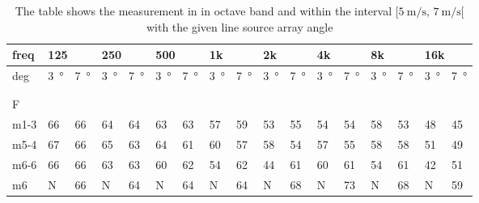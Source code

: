 \begin{table}[H]
\centering
\caption{The table shows the measurement in in octave band and within the interval $[\SI{5}{\meter\per\second},\, \SI{7}{\meter\per\second}[ $ with the given line source array angle}
\begin{tabular}{l|l|l|l|l|l|l|l|l|l|l|l|l|l|l|ll}
freq & \multicolumn{2}{l|}{125} & \multicolumn{2}{l|}{250} & \multicolumn{2}{l|}{500} & \multicolumn{2}{l|}{1k} & \multicolumn{2}{l|}{2k} & \multicolumn{2}{l|}{4k} & \multicolumn{2}{l|}{8k} & \multicolumn{2}{l}{16k}  \\ \hline
deg  &     \SI{3}{\degree}        &    \SI{7}{\degree}          &     \SI{3}{\degree}          &   \SI{7}{\degree}           &       \SI{3}{\degree}        &      \SI{7}{\degree}        &     \SI{3}{\degree}         &     \SI{7}{\degree}         &       \SI{3}{\degree}       &    \SI{7}{\degree}          &      \SI{3}{\degree}        &        \SI{7}{\degree}      &      \SI{3}{\degree}        &       \SI{7}{\degree}       & \multicolumn{1}{l|}{ \SI{3}{\degree} } &  \SI{7}{\degree}  \\ \hline
 & \multicolumn{2}{l|}{} & \multicolumn{2}{l|}{} & \multicolumn{2}{l|}{} & \multicolumn{2}{l|}{} & \multicolumn{2}{l|}{} & \multicolumn{2}{l|}{}& \multicolumn{2}{l|}{}& \multicolumn{2}{l}{}     \\ 
\multicolumn{17}{l}{ } \\   
F & \multicolumn{2}{l|}{} & \multicolumn{2}{l|}{} & \multicolumn{2}{l|}{} & \multicolumn{2}{l|}{} & \multicolumn{2}{l|}{} & \multicolumn{2}{l|}{}& \multicolumn{2}{l|}{}& \multicolumn{2}{l}{}     \\ \hline
m1-3  &     66   &      66  &   64    &  64      &        63     &    63       &  57       &    59        &    53         &    55        &      54       &     54       &      58      &    53        & \multicolumn{1}{l|}{48} &  45\\
m5-4   &    67  &       66  &      65  & 63     &       64      &     61      &   60     &     57       &    58         &     54       &      57       &     55       &       58     &       58     & \multicolumn{1}{l|}{51} &  49\\
m6-6   &    66  &      66   &     63   &   63    &      60       &     62      &  54       &     62       &     44        &      61      &        60     &       61     &       54     &       61     & \multicolumn{1}{l|}{42} & 51 \\
m6   &    N  &      66   &   N  &   64     &   N        &     64      &    N    &     64       &      N      &       68     &      N      &       73     &        N   &       68     & \multicolumn{1}{l|}{N} &  59\\

\end{tabular}
\end{table}
